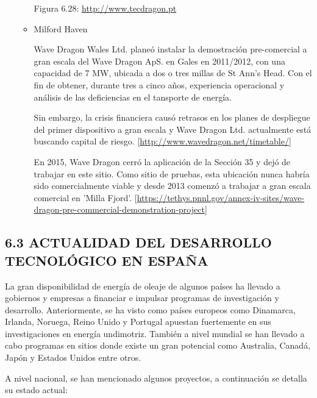 \documentclass[]{article}
\begin{document}
\begin{itemize}
\begin{itemize}
    Figura 6.28: \url{http://www.tecdragon.pt}
  \item
    Milford Haven

    Wave Dragon Wales Ltd. planeó instalar la demostración pre-comercial
    a gran escala del Wave Dragon ApS. en Gales en 2011/2012, con una
    capacidad de 7 MW, ubicada a dos o tres millas de St Ann's Head. Con
    el fin de obtener, durante tres a cinco años, experiencia
    operacional y análisis de las deficiencias en el tansporte de
    energía.

    Sin embargo, la crisis financiera causó retrasos en los planes de
    despliegue del primer dispositivo a gran escala y Wave Dragon Ltd.
    actualmente está buscando capital de riesgo.
    {[}\url{http://www.wavedragon.net/timetable/}{]}

    En 2015, Wave Dragon cerró la aplicación de la Sección 35 y dejó de
    trabajar en este sitio. Como sitio de pruebas, esta ubicación nunca
    habría sido comercialmente viable y desde 2013 comenzó a trabajar a
    gran escala comercial en 'Milla Fjord'.
    {[}\url{https://tethys.pnnl.gov/annex-iv-sites/wave-dragon-pre-commercial-demonstration-project}{]}
  \end{itemize}
\end{itemize}

\subsection{6.3 ACTUALIDAD DEL DESARROLLO TECNOLÓGICO EN
ESPAÑA}\label{header-n430}

La gran disponibilidad de energía de oleaje de algunos países ha llevado
a gobiernos y empresas a financiar e impulsar programas de investigación
y desarrollo. Anteriormente, se ha visto como países europeos como
Dinamarca, Irlanda, Noruega, Reino Unido y Portugal apuestan fuertemente
en sus investigaciones en energía undimotriz. También a nivel mundial se
han llevado a cabo programas en sitios donde existe un gran potencial
como Australia, Canadá, Japón y Estados Unidos entre otros.

A nivel nacional, se han mencionado algunos proyectos, a continuación se
detalla su estado actual:
\end{document}
